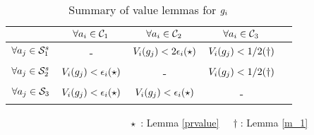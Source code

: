 \begin{table}[t]
	\caption{Summary of value lemmas for $g_i$}
	\label{table1} 
	\begin{center}
\begin{tabular}{ |c|c|c|c|c|}
	\hline
	& $\forall a_i \in \mathcal{C}_1$ & $\forall a_i \in \mathcal{C}_2$ & $\forall a_i \in \mathcal{C}_3$\\ 
	\hline
	$\forall a_j \in \mathcal{S}_1^s$ & - & $V_i(g_j) < 2\epsilon_i (\star)$  & $V_i(g_j) < 1/2(\dagger)$     \\  
	\hline
	$\forall a_j \in \mathcal{S}_2^s$ & $V_i(g_j) < \epsilon_i(\star)$ & - & $V_i(g_j) < 1/2(\dagger)$  \\
	\hline
	$\forall a_j \in \mathcal{S}_3$ & $V_i(g_j) < \epsilon_i(\star)$  & $V_i(g_j) < \epsilon_i(\star)$  & -  \\
	\hline
	
\end{tabular}
\end{center}
$\hspace{150pt}\star$ : Lemma \ref{prvalue} $\hspace{10pt}\dagger$: Lemma \ref{m_1}\\
\end{table}
